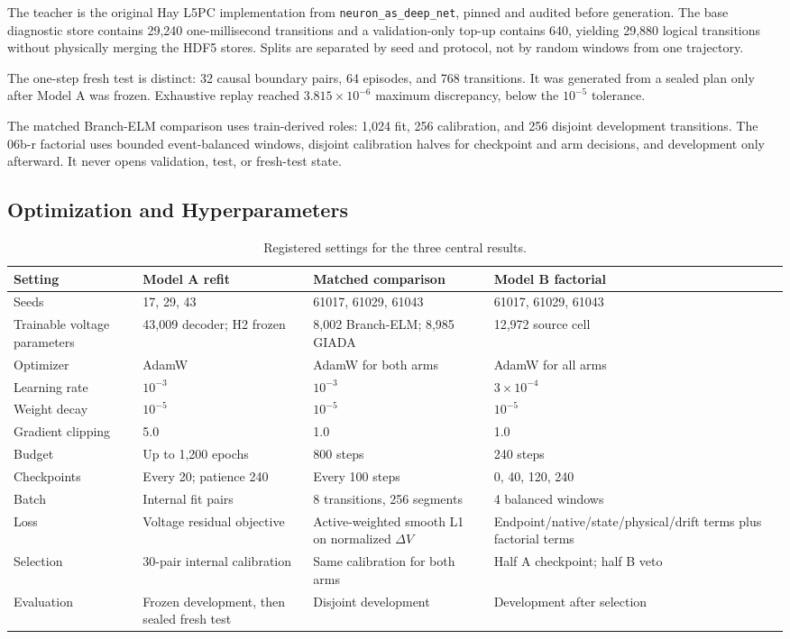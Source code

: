 \documentclass[11pt]{article}
\begin{document}
The teacher is the original Hay L5PC implementation from
\texttt{neuron\_as\_deep\_net}, pinned and audited before generation. The base
diagnostic store contains 29,240 one-millisecond transitions and a
validation-only top-up contains 640, yielding 29,880 logical transitions
without physically merging the HDF5 stores. Splits are separated by seed and
protocol, not by random windows from one trajectory.

The one-step fresh test is distinct: 32 causal boundary pairs, 64 episodes,
and 768 transitions. It was generated from a sealed plan only after Model A
was frozen. Exhaustive replay reached $3.815\times10^{-6}$ maximum discrepancy,
below the $10^{-5}$ tolerance.

The matched Branch-ELM comparison uses train-derived roles: 1,024 fit, 256
calibration, and 256 disjoint development transitions. The 06b-r factorial
uses bounded event-balanced windows, disjoint calibration halves for
checkpoint and arm decisions, and development only afterward. It never opens
validation, test, or fresh-test state.

\subsection{Optimization and Hyperparameters}

\begin{table}[t]
\centering
\caption{Registered settings for the three central results.}
\label{tab:hyperparameters}
\small
\begin{tabularx}{\textwidth}{p{2.8cm}YYY}
\toprule
Setting & Model A refit & Matched comparison & Model B factorial \\
\midrule
Seeds & 17, 29, 43 & 61017, 61029, 61043 & 61017, 61029, 61043 \\
Trainable voltage parameters & 43,009 decoder; H2 frozen & 8,002 Branch-ELM;
8,985 GIADA & 12,972 source cell \\
Optimizer & AdamW & AdamW for both arms & AdamW for all arms \\
Learning rate & $10^{-3}$ & $10^{-3}$ & $3\times10^{-4}$ \\
Weight decay & $10^{-5}$ & $10^{-5}$ & $10^{-5}$ \\
Gradient clipping & 5.0 & 1.0 & 1.0 \\
Budget & Up to 1,200 epochs & 800 steps & 240 steps \\
Checkpoints & Every 20; patience 240 & Every 100 steps & 0, 40, 120, 240 \\
Batch & Internal fit pairs & 8 transitions, 256 segments & 4 balanced windows \\
Loss & Voltage residual objective & Active-weighted smooth L1 on normalized
$\Delta V$ & Endpoint/native/state/physical/drift terms plus factorial terms \\
Selection & 30-pair internal calibration & Same calibration for both arms &
Half A checkpoint; half B veto \\
Evaluation & Frozen development, then sealed fresh test & Disjoint development
& Development after selection \\
\bottomrule
\end{tabularx}
\end{table}
\end{document}
